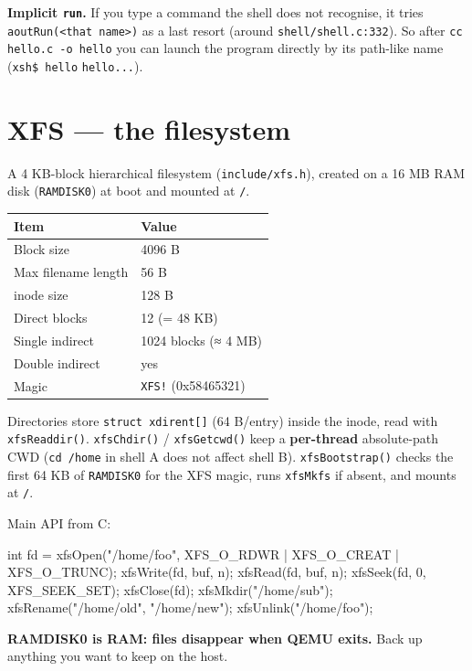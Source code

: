 \documentclass[a4paper,11pt]{article}
\begin{document}
\textbf{Implicit \texttt{run}.} If you type a command the shell does not
recognise, it tries \verb|aoutRun(<that name>)| as a last resort (around
\verb|shell/shell.c:332|). So after \verb|cc hello.c -o hello| you can launch the
program directly by its path-like name (\verb|xsh$ hello| \textrightarrow{}
\verb|hello...|).

\section{XFS --- the filesystem}
A 4 KB-block hierarchical filesystem (\verb|include/xfs.h|), created on a 16 MB
RAM disk (\verb|RAMDISK0|) at boot and mounted at \verb|/|.

\begin{center}\footnotesize
\begin{tabular}{@{}l l@{}}
\toprule \textbf{Item} & \textbf{Value}\\ \midrule
Block size & 4096 B\\
Max filename length & 56 B\\
inode size & 128 B\\
Direct blocks & 12 (= 48 KB)\\
Single indirect & 1024 blocks (≈ 4 MB)\\
Double indirect & yes\\
Magic & \verb|XFS!| (0x58465321)\\
\bottomrule
\end{tabular}
\end{center}

Directories store \verb|struct xdirent[]| (64 B/entry) inside the inode, read
with \verb|xfsReaddir()|. \verb|xfsChdir()| / \verb|xfsGetcwd()| keep a
\textbf{per-thread} absolute-path CWD (\verb|cd /home| in shell A does not affect
shell B). \verb|xfsBootstrap()| checks the first 64 KB of \verb|RAMDISK0| for the
XFS magic, runs \verb|xfsMkfs| if absent, and mounts at \verb|/|.

Main API from C:
\begin{code}
int fd = xfsOpen("/home/foo", XFS_O_RDWR | XFS_O_CREAT | XFS_O_TRUNC);
xfsWrite(fd, buf, n);  xfsRead(fd, buf, n);
xfsSeek(fd, 0, XFS_SEEK_SET);  xfsClose(fd);
xfsMkdir("/home/sub");  xfsRename("/home/old", "/home/new");  xfsUnlink("/home/foo");
\end{code}
\textbf{RAMDISK0 is RAM: files disappear when QEMU exits.} Back up anything you
want to keep on the host.
\end{document}
